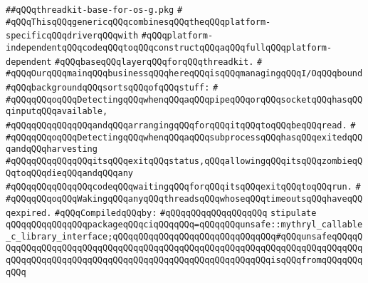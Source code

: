 \label{src/lib/src/lib/thread-kit/src/glue/threadkit-base-for-os-g.pkg}
\verb|##qQQqthreadkit-base-for-os-g.pkg|\newline
\verb|#|\newline
\verb|#qQQqThisqQQqgenericqQQqcombinesqQQqtheqQQqplatform-specificqQQqdriverqQQqwith|\newline
\verb|#qQQqplatform-independentqQQqcodeqQQqtoqQQqconstructqQQqaqQQqfullqQQqplatform-dependent|\newline
\verb|#qQQqbaseqQQqlayerqQQqforqQQqthreadkit.|\newline
\verb|#|\newline
\verb|#qQQqOurqQQqmainqQQqbusinessqQQqhereqQQqisqQQqmanagingqQQqI/OqQQqbound|\newline
\verb|#qQQqbackgroundqQQqsortsqQQqofqQQqstuff:|\newline
\verb|#|\newline
\verb|#qQQqqQQqoqQQqDetectingqQQqwhenqQQqaqQQqpipeqQQqorqQQqsocketqQQqhasqQQqinputqQQqavailable,|\newline
\verb|#qQQqqQQqqQQqqQQqandqQQqarrangingqQQqforqQQqitqQQqtoqQQqbeqQQqread.|\newline
\verb|#|\newline
\verb|#qQQqqQQqoqQQqDetectingqQQqwhenqQQqaqQQqsubprocessqQQqhasqQQqexitedqQQqandqQQqharvesting|\newline
\verb|#qQQqqQQqqQQqqQQqitsqQQqexitqQQqstatus,qQQqallowingqQQqitsqQQqzombieqQQqtoqQQqdieqQQqandqQQqany|\newline
\verb|#qQQqqQQqqQQqqQQqcodeqQQqwaitingqQQqforqQQqitsqQQqexitqQQqtoqQQqrun.|\newline
\verb|#|\newline
\verb|#qQQqqQQqoqQQqWakingqQQqanyqQQqthreadsqQQqwhoseqQQqtimeoutsqQQqhaveqQQqexpired.|\newline
\newline
\verb|#qQQqCompiledqQQqby:|\newline
\verb|#qQQqqQQqqQQqqQQqqQQq|\newline
\newline
\newline
\verb|stipulate|\newline
\verb|qQQqqQQqqQQqqQQqpackageqQQqciqQQqqQQq=qQQqqQQqunsafe::mythryl_callable_c_library_interface;qQQqqQQqqQQqqQQqqQQqqQQqqQQqqQQq#qQQqunsafeqQQqqQQqqQQqqQQqqQQqqQQqqQQqqQQqqQQqqQQqqQQqqQQqqQQqqQQqqQQqqQQqqQQqqQQqqQQqqQQqqQQqqQQqqQQqqQQqqQQqqQQqqQQqqQQqqQQqqQQqqQQqqQQqisqQQqfromqQQqqQQqqQQq|\newline

